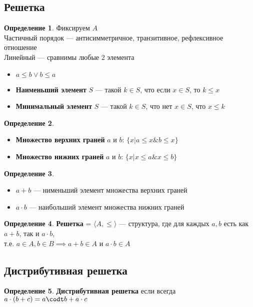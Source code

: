 \documentclass[english]{article}
\theoremstyle{plain}
\theoremstyle{remark}
\theoremstyle{definition}
\newtheorem*{definition}{Определение}
\begin{document}
\subsection{Решетка}
\label{sec:org434fbd8}
\begin{definition}
Фиксируем \(A\) \\
Частичный порядок --- антисимметричное, транзитивное, рефлексивное отношение \\
Линейный --- сравнимы любые 2 элемента \\
\begin{itemize}
\item \(a \le b \vee b \le a\)
\item \textbf{Наименьший элемент} \(S\) --- такой \(k \in S\), что если \(x \in S\), то \(k \le x\)
\item \textbf{Минимальный элемент} \(S\) --- такой \(k \in S\), что нет \(x \in S\), что \(x \le k\)
\end{itemize}
\label{orgb0ade5e}
\end{definition}
\begin{definition}
\-
\begin{itemize}
\item \textbf{Множество верхних граней} \(a\) и \(b\): \(\{x \big| a \le x \& b \le x\}\)
\item \textbf{Множество нижних граней} \(a\) и \(b\): \(\{x \big| x \le a \& x \le b\}\)
\end{itemize}
\label{org87ff90c}
\end{definition}
\begin{definition}
\-
\begin{itemize}
\item \textbf{\(a + b\)} --- нименьший элемент множества верхних граней
\item \textbf{\(a \cdot b\)} --- наибольший элемент множества нижних граней
\end{itemize}
\label{org487335f}
\end{definition}
\begin{definition}
\textbf{Решетка} = \(\langle A, \le \rangle\) --- структура, где для каждых \(a, b\) есть как \(a + b\), так и \(a \cdot b\), \\
т.е. \(a \in A, b \in B \implies a + b \in A\) и \(a \cdot b \in A\)
\label{orgd5b2879}
\end{definition}
\subsection{Дистрибутивная решетка}
\label{sec:org0437a37}
\begin{definition}
\textbf{Дистрибутивная решетка} если всегда  \(a \cdot (b + c) = a\codt b + a \cdot c\)
\label{org802842e}
\end{definition}
\end{document}
